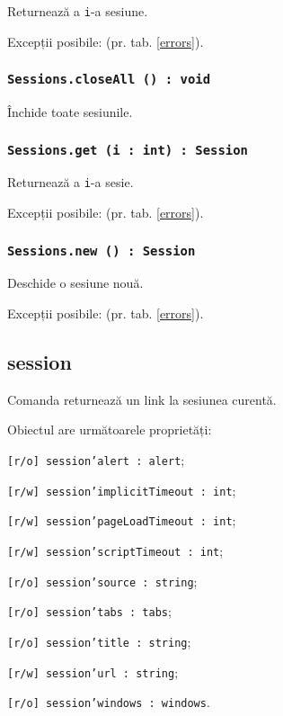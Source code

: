 Returnează a \texttt{i}-a sesiune.

Excepții posibile:  (pr. tab. \ref{errors}).

\subsubsection{\texttt{Sessions.closeAll () : void}}

Închide toate sesiunile.

\subsubsection{\texttt{Sessions.get (i : int) : Session}}

Returnează a \texttt{i}-a sesie.

Excepții posibile:  (pr. tab. \ref{errors}).

\subsubsection{\texttt{Sessions.new () : Session}}

Deschide o sesiune nouă.

Excepții posibile:  (pr. tab. \ref{errors}).

\subsection{{\color{orange} session}}

Comanda \session{} returnează un link la sesiunea curentă.

Obiectul \session{} are următoarele proprietăți:
\begin{icItems}
	\item \texttt{[r/o] session'alert : alert};
	\item \texttt{[r/w] session'implicitTimeout : int};
	\item \texttt{[r/w] session'pageLoadTimeout : int};
	\item \texttt{[r/w] session'scriptTimeout : int};
	\item \texttt{[r/o] session'source : string};
	\item \texttt{[r/o] session'tabs : tabs};
	\item \texttt{[r/o] session'title : string};
	\item \texttt{[r/w] session'url : string};
	\item \texttt{[r/o] session'windows : windows}.
\end{icItems}

